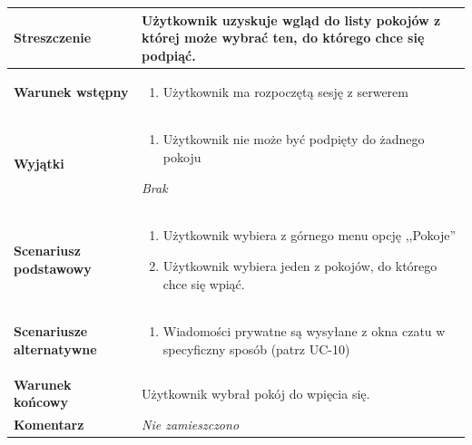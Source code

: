 \documentclass[11pt,oneside,a4paper,titlepage,onecolumn]{article}
\newenvironment{enumreq}
{ \begin{enumerate}[topsep=0pt,itemsep=-1ex,partopsep=1ex,parsep=1ex] }
{ \end{enumerate}                  }
\begin{document}
{\begin{tabular}{ | l | l | }
	\hline
		\parbox[t]{4cm}{\textbf{Streszczenie}} & \parbox[t]{11cm}{
			Użytkownik uzyskuje wgląd do listy pokojów z której może
			wybrać ten, do którego chce się podpiąć.
			
		}\\
		
	\hline
		\parbox[t]{4cm}{\textbf{Warunek wstępny}} & \parbox[t]{11cm}{
			\begin{enumreq}
				\item Użytkownik ma rozpoczętą sesję z serwerem
			\end{enumreq}
				
		}
		\\
		
	\hline
		\parbox[t]{4cm}{\textbf{Wyjątki}} & \parbox[t]{11cm}{
			\begin{enumreq}
				\item Użytkownik nie może być podpięty do żadnego pokoju
			\end{enumreq}
			\textit{Brak}
			
		}
		\\

	\hline
		\parbox[t]{4cm}{\textbf{Scenariusz podstawowy}} & \parbox[t]{11cm}{
			\begin{enumreq}
				\item Użytkownik wybiera z górnego menu opcję ,,Pokoje''
				\item Użytkownik wybiera jeden z pokojów, do którego chce
				się wpiąć.
			\end{enumreq}
		}
		\\
		
	\hline
		\parbox[t]{4cm}{\textbf{Scenariusze alternatywne}} & \parbox[t]
		{11cm}{
			\begin{enumreq}
				\item Wiadomości prywatne są wysyłane z okna czatu w 
				specyficzny sposób (patrz UC-10)
			\end{enumreq}
		}
		\\
		
	\hline
		\parbox[t]{4cm}{\textbf{Warunek końcowy}} & \parbox[t]{11cm}{
			Użytkownik wybrał pokój do wpięcia się.
		}
		\\
		
	\hline
		\parbox[t]{4cm}{\textbf{Komentarz}} & \parbox[t]{11cm}{
			\textit{Nie zamieszczono}
		}
		\\

	\hline
\end{tabular}

\vspace{2em}

}
\end{document}
